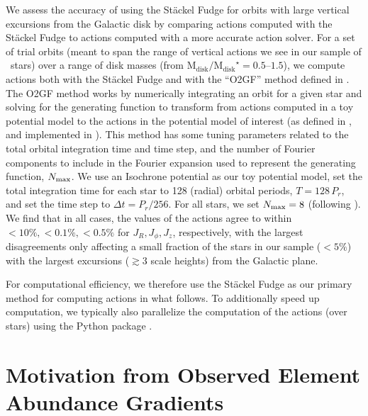\documentclass[modern]{aastex63}
\newcommand{\apogee}{\acronym{APOGEE}}
\newcommand{\mdisk}{\ensuremath{\mathrm{M}_\mathrm{disk}}}
\newcommand{\mratio}{\ensuremath{\mdisk / \mdisk^\star}}
\begin{document}
We assess the accuracy of using the St\"ackel Fudge for orbits with large
vertical excursions from the Galactic disk by comparing actions computed with
the St\"ackel Fudge to actions computed with a more accurate action solver.
For a set of trial orbits (meant to span the range of vertical actions we see in
our sample of \apogee\ stars) over a range of disk masses (from
$\mratio=0.5$--$1.5$), we compute actions both with the St\"ackel Fudge and with
the ``O2GF'' method defined in \citet{Sanders:2014, Sanders:2016}.
The O2GF method works by numerically integrating an orbit for a given star and
solving for the generating function to transform from actions computed in a toy
potential model to the actions in the potential model of interest (as defined in
\citealt{Sanders:2014}, and implemented in ).
This method has some tuning parameters related to the total orbital integration
time and time step, and the number of Fourier components to include in the
Fourier expansion used to represent the generating function, $N_{\rm max}$.
We use an Isochrone potential as our toy potential model, set the total
integration time for each star to 128 (radial) orbital periods, $T=128\,P_r$,
and set the time step to $\Delta t = P_r / 256$. For all stars, we set $N_{\rm
max} = 8$ (following \citealt{Sanders:2016}).
We find that in all cases, the values of the actions agree to within $<10\%,
<0.1\%, <0.5\%$ for $J_R, J_\phi, J_z$, respectively, with the largest
disagreements only affecting a small fraction of the stars in our sample
($<5\%$) with the largest excursions ($\gtrsim 3$ scale heights) from the
Galactic plane.

For computational efficiency, we therefore use the St\"ackel Fudge as our
primary method for computing actions in what follows.
To additionally speed up computation, we typically also parallelize the
computation of the actions (over stars) using the Python package
 \citep{schwimmbad}.


\section{Motivation from Observed Element Abundance Gradients}
\label{sec:motivation}
\end{document}
